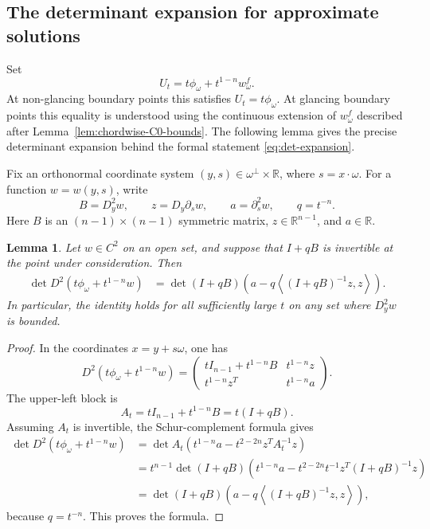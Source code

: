 \documentclass[11pt]{article}
\numberwithin{equation}{section}
\newtheorem{lemma}[theorem]{Lemma}
\newcommand{\R}{\mathbb R}
\begin{document}
\subsection{The determinant expansion for approximate solutions}\label{subsec:determinant-expansion}

Set
\[
    U_t=t\phi_\omega+t^{1-n}w_\omega^f.
\]
At non-glancing boundary points this satisfies \(U_t=t\phi_\omega\).  At glancing boundary points this equality is understood using the continuous extension of \(w_\omega^f\) described after Lemma~\ref{lem:chordwise-C0-bounds}.  The following lemma gives the precise determinant expansion behind the formal statement \eqref{eq:det-expansion}.

Fix an orthonormal coordinate system \((y,s)\in\omega^\perp\times\R\), where \(s=x\cdot\omega\).  For a function \(w=w(y,s)\), write
\[
    B=D_y^2w,
    \qquad
    z=D_y\partial_s w,
    \qquad
    a=\partial_s^2 w,
    \qquad
    q=t^{-n}.
\]
Here \(B\) is an \((n-1)\times(n-1)\) symmetric matrix, \(z\in\R^{n-1}\), and \(a\in\R\).

\begin{lemma}\label{lem:det-exact-schur}
Let \(w\in C^2\) on an open set, and suppose that \(I+qB\) is invertible at the point under consideration.  Then
\begin{equation}\label{eq:det-exact-schur}
\begin{aligned}
    \det D^2(t\phi_\omega+t^{1-n}w)
    &=
    \det(I+qB)
    \left(
        a-q\left\langle (I+qB)^{-1}z,z\right\rangle
    \right).
\end{aligned}
\end{equation}
In particular, the identity holds for all sufficiently large \(t\) on any set where \(D_y^2w\) is bounded.
\end{lemma}

\begin{proof}
In the coordinates \(x=y+s\omega\), one has
\begin{equation}\label{eq:hessian-block-form}
    D^2(t\phi_\omega+t^{1-n}w)
    =
    \begin{pmatrix}
        tI_{n-1}+t^{1-n}B
        &
        t^{1-n}z \\
        t^{1-n}z^T
        &
        t^{1-n}a
    \end{pmatrix}.
\end{equation}
The upper-left block is
\[
    A_t=tI_{n-1}+t^{1-n}B=t(I+qB).
\]
Assuming \(A_t\) is invertible, the Schur-complement formula gives
\begin{align*}
    \det D^2(t\phi_\omega+t^{1-n}w)
    &=
    \det A_t
    \left(
        t^{1-n}a
        -
        t^{2-2n}z^T A_t^{-1}z
    \right) \\
    &=
    t^{n-1}\det(I+qB)
    \left(
        t^{1-n}a
        -
        t^{2-2n}t^{-1}z^T(I+qB)^{-1}z
    \right) \\
    &=
    \det(I+qB)
    \left(
        a-q\left\langle (I+qB)^{-1}z,z\right\rangle
    \right),
\end{align*}
because \(q=t^{-n}\).  This proves the formula.
\end{proof}
\end{document}
